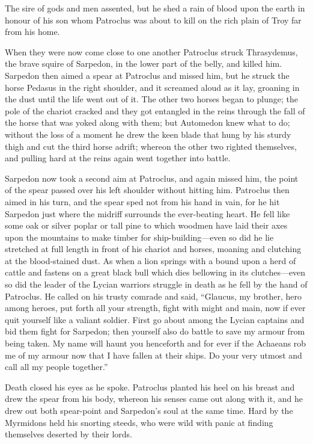 The sire of gods and men assented, but he shed a rain of blood upon the
earth in honour of his son whom Patroclus was about to kill on the rich
plain of Troy far from his home.

When they were now come close to one another Patroclus struck Thrasydemus,
the brave squire of Sarpedon, in the lower part of the belly, and killed
him. Sarpedon then aimed a spear at Patroclus and missed him, but he
struck the horse Pedasus in the right shoulder, and it screamed aloud as
it lay, groaning in the dust until the life went out of it. The other two
horses began to plunge; the pole of the chariot cracked and they got
entangled in the reins through the fall of the horse that was yoked along
with them; but Automedon knew what to do; without the loss of a moment he
drew the keen blade that hung by his sturdy thigh and cut the third horse
adrift; whereon the other two righted themselves, and pulling hard at the
reins again went together into battle.

Sarpedon now took a second aim at Patroclus, and again missed him, the
point of the spear passed over his left shoulder without hitting him.
Patroclus then aimed in his turn, and the spear sped not from his hand in
vain, for he hit Sarpedon just where the midriff surrounds the
ever-beating heart. He fell like some oak or silver poplar or tall pine to
which woodmen have laid their axes upon the mountains to make timber for
ship-building—even so did he lie stretched at full length in front
of his chariot and horses, moaning and clutching at the blood-stained
dust. As when a lion springs with a bound upon a herd of cattle and
fastens on a great black bull which dies bellowing in its clutches—even
so did the leader of the Lycian warriors struggle in death as he fell by
the hand of Patroclus. He called on his trusty comrade and said, “Glaucus,
my brother, hero among heroes, put forth all your strength, fight with
might and main, now if ever quit yourself like a valiant soldier. First go
about among the Lycian captains and bid them fight for Sarpedon; then
yourself also do battle to save my armour from being taken. My name will
haunt you henceforth and for ever if the Achaeans rob me of my armour now
that I have fallen at their ships. Do your very utmost and call all my
people together.”

Death closed his eyes as he spoke. Patroclus planted his heel on his
breast and drew the spear from his body, whereon his senses came out along
with it, and he drew out both spear-point and Sarpedon’s soul at the same
time. Hard by the Myrmidons held his snorting steeds, who were wild with
panic at finding themselves deserted by their lords.

